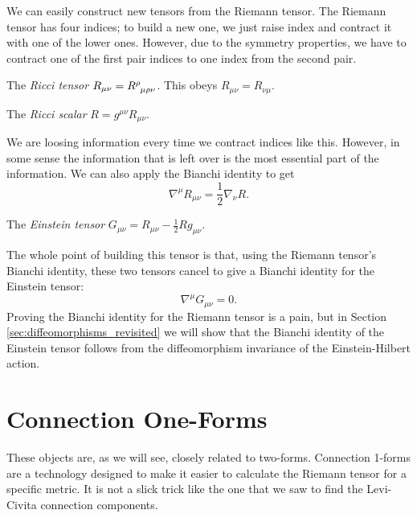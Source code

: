 We can easily construct new tensors from the Riemann tensor. The Riemann tensor has four indices; to build a new one, we just raise index and contract it with one of the lower ones.
However, due to the symmetry properties, we have to contract one of the first pair indices to one index from the second pair.
\begin{definition}[]
  The \emph{Ricci tensor} $R_{\mu\nu} = R \indices{^{\rho}_{\mu\rho\nu}}$. This obeys $R_{\mu\nu} = R_{\nu\mu}$.
\end{definition}
\begin{definition}[]
  The \emph{Ricci scalar} $R= g^{\mu\nu} R_{\mu\nu}$.
\end{definition}
We are loosing information every time we contract indices like this. However, in some sense the information that is left over is the most essential part of the information. 
We can also apply the Bianchi identity to get
\begin{equation}
  \nabla^{\mu} R_{\mu\nu} = \frac{1}{2} \nabla_{\nu} R.
\end{equation}

\begin{definition}[]
  The \emph{Einstein tensor} $G_{\mu\nu} = R_{\mu\nu} - \frac{1}{2} Rg_{\mu\nu}$.
\end{definition}
The whole point of building this tensor is that, using the Riemann tensor's Bianchi identity, these two tensors cancel to give a Bianchi identity for the Einstein tensor: 
\begin{equation}
  \nabla^{\mu} G_{\mu\nu} = 0.
\end{equation}
Proving the Bianchi identity for the Riemann tensor is a pain, but in Section \ref{sec:diffeomorphisms_revisited} we will show that the Bianchi identity of the Einstein tensor follows from the diffeomorphism invariance of the Einstein-Hilbert action.

\section{Connection One-Forms}%
\label{sec:connection_1_forms}

These objects are, as we will see, closely related to two-forms.
Connection 1-forms are a technology designed to make it easier to calculate the Riemann tensor for a specific metric. 
It is not a slick trick like the one that we saw to find the Levi-Civita connection components.

